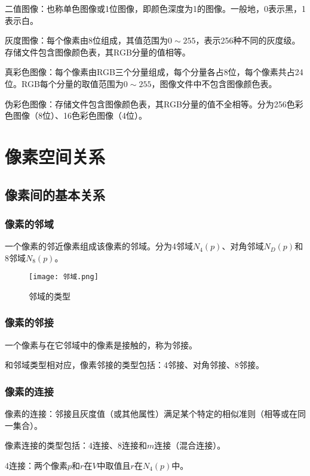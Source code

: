 \documentclass[cn, blue, normal, 12pt]{elegantnote}
\begin{document}
二值图像：也称单色图像或1位图像，即颜色深度为1的图像。一般地，0表示黑，1表示白。

灰度图像：每个像素由8位组成，其值范围为$0\sim 255$，表示256种不同的灰度级。存储文件包含图像颜色表，其RGB分量的值相等。

真彩色图像：每个像素由RGB三个分量组成，每个分量各占8位，每个像素共占24位。RGB每个分量的取值范围为$0\sim 255$，图像文件中不包含图像颜色表。

伪彩色图像：存储文件包含图像颜色表，其RGB分量的值不全相等。分为256色彩色图像（8位）、16色彩色图像（4位）。

\section{像素空间关系}

\subsection{像素间的基本关系}

\subsubsection{像素的邻域}

一个像素的邻近像素组成该像素的邻域。分为4邻域$N_4(p)$、对角邻域$N_D(p)$和8邻域$N_8(p)$。

\begin{figure}[htbp]
    \centering
    \texttt{[image: 邻域.png]}
    \caption{邻域的类型}
\end{figure}

\subsubsection{像素的邻接}

一个像素与在它邻域中的像素是接触的，称为邻接。

和邻域类型相对应，像素邻接的类型包括：4邻接、对角邻接、8邻接。

\subsubsection{像素的连接}

像素的连接：邻接且灰度值（或其他属性）满足某个特定的相似准则（相等或在同一集合）。

像素连接的类型包括：4连接、8连接和$m$连接（混合连接）。

4连接：两个像素$p$和$r$在$V$中取值且$r$在$N_4(p)$中。
\end{document}
